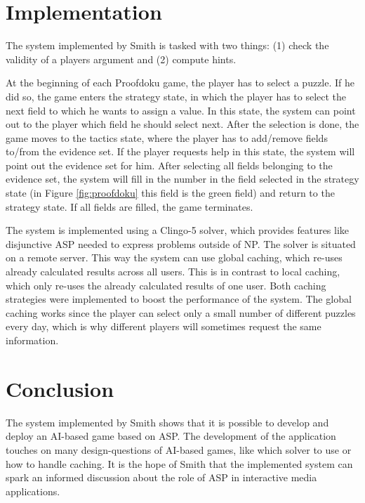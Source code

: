 \documentclass[runningheads]{llncs}
\newcommand{\authorquote}{Smith}
\begin{document}
\section{Implementation} \label{sec:implementation}

The system implemented by \authorquote{} is tasked with two things: (1) check the validity of a players argument and (2) compute hints. 

At the beginning of each Proofdoku game, the player has to select a puzzle. If he did so, the game enters the strategy state, in which the player has to select the next field to which he wants to assign a value. In this state, the system can point out to the player which field he should select next. After the selection is done, the game moves to the tactics state, where the player has to add/remove fields to/from the evidence set. If the player requests help in this state, the system will point out the evidence set for him. After selecting all fields belonging to the evidence set, the system will fill in the number in the field selected in the strategy state (in Figure \ref{fig:proofdoku} this field is the green field) and return to the strategy state. If all fields are filled, the game terminates. 

The system is implemented using a Clingo-5 solver, which provides features like disjunctive ASP \cite{gebser2013advanced} needed to express problems outside of NP. The solver is situated on a remote server. This way the system can use global caching, which re-uses already calculated results across all users. This is in contrast to local caching, which only re-uses the already calculated results of one user. Both caching strategies were implemented to boost the performance of the system. The global caching works since the player can select only a small number of different puzzles every day, which is why different players will sometimes request the same information. 



\section{Conclusion} \label{sec:conclusion}

The system implemented by \authorquote{} shows that it is possible to develop and deploy an AI-based game based on ASP. The development of the application touches on many design-questions of AI-based games, like which solver to use or how to handle caching. It is the hope of \authorquote{} that the implemented system can spark an informed discussion about the role of ASP in interactive media applications. 
\end{document}

